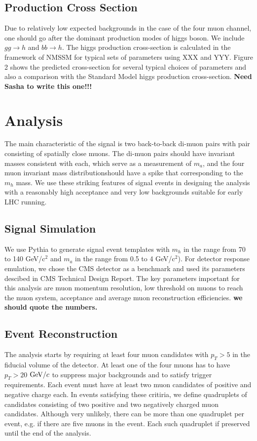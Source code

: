 \documentclass[aps,12pt,superscriptaddress,nofootinbib,floatfix,showpacs]{revtex4}
\begin{document}
\subsection{Production Cross Section}

Due to relatively low expected backgrounds in the case of the four muon channel,
one should go after the dominant production modes of higgs boson. We include $gg
\to h$ and $bb \to h$. The higgs production cross-section is calculated in the framework of NMSSM
for typical sets of parameters using XXX and YYY. Figure 2 shows the predicted
cross-section for several typical choices of parameters and also a comparison
with the Standard Model higgs production cross-section. {\bf Need Sasha to write this one!!!}

\section{Analysis}

The main characteristic of the signal is two back-to-back di-muon pairs with pair consisting of 
spatially close muons. The di-muon pairs should have invariant masses consistent with each, which
serve as a measurement of $m_a$, and the four muon invariant mass distributionshould have a spike 
that corresponding to the $m_h$ mass. We use these striking features of signal events in designing 
the analysis with a reasonably high acceptance and very low backgrounds suitable for early LHC running.

\subsection{Signal Simulation}
We use Pythia to generate signal event templates with $m_h$ in the range from 70 to 140 GeV/c$^2$
and $m_a$  in the range from 0.5 to 4 GeV/c$^2$). For detector response emulation, we chose the CMS 
detector as a benchmark and used its parameters descibed in CMS Technical Design Report. The key 
parameters important for this analysis are muon momentum resolution, low threshold on muons to 
reach the muon system, acceptance and average muon reconstruction efficiencies. {\bf we should quote 
the numbers.} 

\subsection{Event Reconstruction}
The analysis starts by requiring at least four muon candidates with $p_T>5$ \gevc in the fiducial volume of the
detector. At least one of the four muons has to have $p_T>20$ $\mbox{${\rm GeV}/c$}$ to suppress major backgrounds and to 
satisfy trigger requirements. Each event must have at least two muon candidates of positive and negative 
charge each. In events satisfying these critiria, we define quadruplets of candidates consisting of two 
positive and two negatively charged muon candidates. Although very unlikely, there can be more than one 
quadruplet per event, e.g. if there are five muons in the event. Each such quadruplet if preserved until the
end of the analysis.
\end{document}
